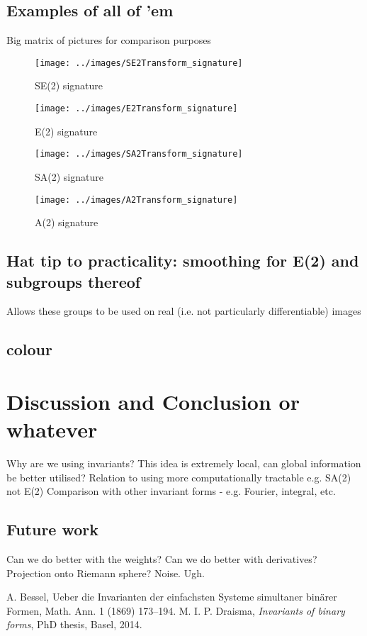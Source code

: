 \documentclass{article}
\begin{document}
\subsection{Examples of all of 'em}
Big matrix of pictures for comparison purposes

\begin{figure}
	\texttt{[image: ../images/SE2Transform\_signature]}
	\caption{SE(2) signature}
\end{figure}
\begin{figure}
	\texttt{[image: ../images/E2Transform\_signature]}
	\caption{E(2) signature}
\end{figure}
\begin{figure}
	\texttt{[image: ../images/SA2Transform\_signature]}
	\caption{SA(2) signature}
\end{figure}
\begin{figure}
	\texttt{[image: ../images/A2Transform\_signature]}
	\caption{A(2) signature}
\end{figure}

\subsection{Hat tip to practicality: smoothing for E(2) and subgroups thereof}
Allows these groups to be used on real (i.e. not particularly
differentiable) images

\subsection{colour}

\section{Discussion and Conclusion or whatever}
Why are we using invariants? 
This idea is extremely local, can global information be better utilised?
Relation to using more computationally
tractable e.g. SA(2) not E(2)
Comparison with other invariant forms - e.g. Fourier, integral, etc.

\subsection{Future work}
Can we do better with the weights?
Can we do better with derivatives?
Projection onto Riemann sphere?
Noise. Ugh.

\begin{thebibliography}{99}
 A. Bessel, Ueber die Invarianten der einfachsten Systeme simultaner bin\"arer Formen, Math. Ann. 1 (1869) 173--194.
 M. I. P. Draisma, {\em Invariants of binary forms}, PhD thesis, Basel, 2014.
\end{thebibliography}
\end{document}
